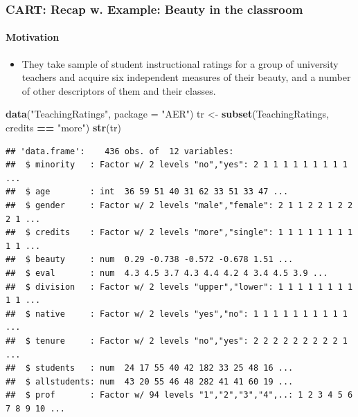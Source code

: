 \documentclass[
  shownotes,
  xcolor={svgnames},
  hyperref={colorlinks,citecolor=DarkBlue,linkcolor=DarkRed,urlcolor=DarkBlue}
  , aspectratio=169]{beamer}
\newenvironment{Shaded}{\begin{snugshade}}{\end{snugshade}}
\newcommand{\DataTypeTok}[1]{\textcolor[rgb]{0.13,0.29,0.53}{#1}}
\newcommand{\KeywordTok}[1]{\textcolor[rgb]{0.13,0.29,0.53}{\textbf{#1}}}
\newcommand{\NormalTok}[1]{#1}
\newcommand{\OperatorTok}[1]{\textcolor[rgb]{0.81,0.36,0.00}{\textbf{#1}}}
\newcommand{\StringTok}[1]{\textcolor[rgb]{0.31,0.60,0.02}{#1}}
\begin{document}
\begin{frame}[fragile]
\frametitle{CART: Recap w. Example: Beauty in the classroom}
\framesubtitle{Motivation}


\begin{itemize}
\item They take sample of student instructional ratings for a group of university teachers and acquire six independent measures of their beauty, and a number of other descriptors of them and their classes. 
\end{itemize}


\begin{scriptsize}
\begin{Shaded}
\begin{Highlighting}[]
\KeywordTok{data}\NormalTok{(}\StringTok{"TeachingRatings"}\NormalTok{, }\DataTypeTok{package =} \StringTok{"AER"}\NormalTok{)}
\NormalTok{tr \textless{}{-}}\StringTok{ }\KeywordTok{subset}\NormalTok{(TeachingRatings, credits }\OperatorTok{==}\StringTok{ "more"}\NormalTok{)}
\KeywordTok{str}\NormalTok{(tr)}
\end{Highlighting}
\end{Shaded}

\end{scriptsize}
\begin{tiny}

\begin{verbatim}
## 'data.frame':    436 obs. of  12 variables:
##  $ minority   : Factor w/ 2 levels "no","yes": 2 1 1 1 1 1 1 1 1 1 ...
##  $ age        : int  36 59 51 40 31 62 33 51 33 47 ...
##  $ gender     : Factor w/ 2 levels "male","female": 2 1 1 2 2 1 2 2 2 1 ...
##  $ credits    : Factor w/ 2 levels "more","single": 1 1 1 1 1 1 1 1 1 1 ...
##  $ beauty     : num  0.29 -0.738 -0.572 -0.678 1.51 ...
##  $ eval       : num  4.3 4.5 3.7 4.3 4.4 4.2 4 3.4 4.5 3.9 ...
##  $ division   : Factor w/ 2 levels "upper","lower": 1 1 1 1 1 1 1 1 1 1 ...
##  $ native     : Factor w/ 2 levels "yes","no": 1 1 1 1 1 1 1 1 1 1 ...
##  $ tenure     : Factor w/ 2 levels "no","yes": 2 2 2 2 2 2 2 2 2 1 ...
##  $ students   : num  24 17 55 40 42 182 33 25 48 16 ...
##  $ allstudents: num  43 20 55 46 48 282 41 41 60 19 ...
##  $ prof       : Factor w/ 94 levels "1","2","3","4",..: 1 2 3 4 5 6 7 8 9 10 ...
\end{verbatim}


\end{tiny}   
\end{frame}
\end{document}
